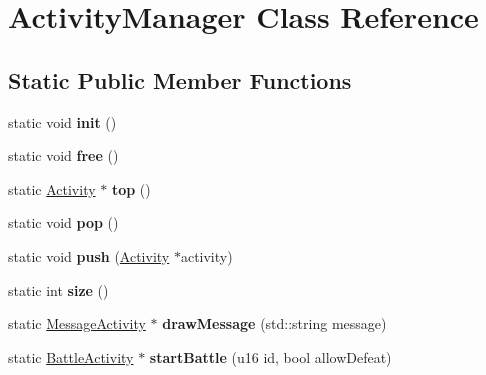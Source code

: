 \hypertarget{classActivityManager}{\section{Activity\-Manager Class Reference}
\label{classActivityManager}
}
\subsection*{Static Public Member Functions}
\begin{DoxyCompactItemize}
\item 
\hypertarget{classActivityManager_a59f65b6fc5772088b35d9d4d062db793}{static void {\bfseries init} ()}\label{classActivityManager_a59f65b6fc5772088b35d9d4d062db793}

\item 
\hypertarget{classActivityManager_ab7470be868beeb92ffba805bd53441fb}{static void {\bfseries free} ()}\label{classActivityManager_ab7470be868beeb92ffba805bd53441fb}

\item 
\hypertarget{classActivityManager_af4e91287c2f04b5c3fc8619c108998b8}{static \hyperlink{classActivity}{Activity} $\ast$ {\bfseries top} ()}\label{classActivityManager_af4e91287c2f04b5c3fc8619c108998b8}

\item 
\hypertarget{classActivityManager_a7bb249958444325228d66431c1d03978}{static void {\bfseries pop} ()}\label{classActivityManager_a7bb249958444325228d66431c1d03978}

\item 
\hypertarget{classActivityManager_aeb64df781f0e5322abf768ec60e6f0fc}{static void {\bfseries push} (\hyperlink{classActivity}{Activity} $\ast$activity)}\label{classActivityManager_aeb64df781f0e5322abf768ec60e6f0fc}

\item 
\hypertarget{classActivityManager_ab0d3a3ee6d0164a4b474c6ee2094fa7f}{static int {\bfseries size} ()}\label{classActivityManager_ab0d3a3ee6d0164a4b474c6ee2094fa7f}

\item 
\hypertarget{classActivityManager_a514ebca0ffbfdae234fa887fadf91d02}{static \hyperlink{classMessageActivity}{Message\-Activity} $\ast$ {\bfseries draw\-Message} (std\-::string message)}\label{classActivityManager_a514ebca0ffbfdae234fa887fadf91d02}

\item 
\hypertarget{classActivityManager_a855105c4230af046eab6e6e8bcf08ba5}{static \hyperlink{classBattleActivity}{Battle\-Activity} $\ast$ {\bfseries start\-Battle} (u16 id, bool allow\-Defeat)}\label{classActivityManager_a855105c4230af046eab6e6e8bcf08ba5}

\end{DoxyCompactItemize}
